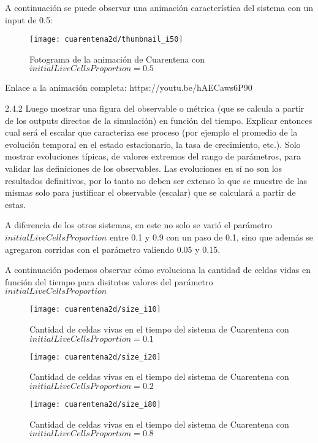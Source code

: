A continuación se puede observar una animación característica del sistema con un input de 0.5:

\begin{figure}[H]
    \centering
    \texttt{[image: cuarentena2d/thumbnail\_i50]}
    \caption{Fotograma de la animación de Cuarentena con $initialLiveCellsProportion = 0.5$}
    \label{fig:thumbnailcuarentena2d_i50}
\end{figure}

Enlace a la animación completa: https://youtu.be/hAECaws6P90

2.4.2 Luego mostrar una figura del observable o métrica (que se calcula a partir de los outputs 
directos de la simulación) en función del tiempo. Explicar entonces cual será el escalar que 
caracteriza ese proceso (por ejemplo el promedio de la evolución temporal en el estado 
estacionario, la tasa de crecimiento, etc.). Solo mostrar evoluciones típicas, de valores extremos 
del rango de parámetros, para validar las definiciones de los observables. Las evoluciones en sí 
no son los resultados definitivos, por lo tanto no deben ser extenso lo que se muestre de las 
mismas solo para justificar el observable (escalar) que se calculará a partir de estas.

A diferencia de los otros sistemas, en este no solo se varió el parámetro $initialLiveCellsProportion$ entre 0.1 y 0.9 con un paso de 0.1, 
sino que además se agregaron corridas con el parámetro valiendo 0.05 y 0.15.

A continuación podemos observar cómo evoluciona la cantidad de celdas vidas en función del tiempo para disitntos valores del parámetro $initialLiveCellsProportion$

\begin{figure}[H]
    \centering
    \texttt{[image: cuarentena2d/size\_i10]}
    \caption{Cantidad de celdas vivas en el tiempo del sistema de Cuarentena con $initialLiveCellsProportion = 0.1$}
    \label{fig:cuarentena2d_i10}
\end{figure}
\begin{figure}[H]
    \centering
    \texttt{[image: cuarentena2d/size\_i20]}
    \caption{Cantidad de celdas vivas en el tiempo del sistema de Cuarentena con $initialLiveCellsProportion = 0.2$}
    \label{fig:cuarentena2d_i20}
\end{figure}
\begin{figure}[H]
    \centering
    \texttt{[image: cuarentena2d/size\_i80]}
    \caption{Cantidad de celdas vivas en el tiempo del sistema de Cuarentena con $initialLiveCellsProportion = 0.8$}
    \label{fig:cuarentena2d_i80}
\end{figure}

